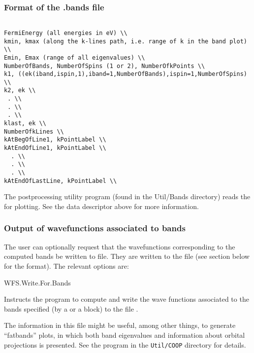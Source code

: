 \subsubsection{Format of the .bands file}

\begin{verbatim}

FermiEnergy (all energies in eV) \\
kmin, kmax (along the k-lines path, i.e. range of k in the band plot) \\
Emin, Emax (range of all eigenvalues) \\
NumberOfBands, NumberOfSpins (1 or 2), NumberOfkPoints \\
k1, ((ek(iband,ispin,1),iband=1,NumberOfBands),ispin=1,NumberOfSpins) \\
k2, ek \\
 . \\
 . \\
 . \\
klast, ek \\
NumberOfkLines \\
kAtBegOfLine1, kPointLabel \\
kAtEndOfLine1, kPointLabel \\
  . \\
  . \\
  . \\
kAtEndOfLastLine, kPointLabel \\
\end{verbatim}

\noindent
The  postprocessing
utility program (found in the Util/Bands directory) reads the
 for plotting.  See the  data
descriptor above for more information.


\subsubsection{Output of wavefunctions associated to bands}
\label{sec:wf-bands}

The user can optionally request that the wavefunctions corresponding
to the computed bands be written to file.  They are written to the
 file (see section below for the format). The
relevant options are:

\begin{fdflogicalF}{WFS.Write.For.Bands}
  
  Instructs the program to compute and write the wave functions
  associated to the bands specified (by a  or a
   block) to the file .

  The information in this file might be useful, among other things, to
  generate ``fatbands'' plots, in which both band eigenvalues and
  information about orbital projections is presented.
   See the  program in the
  \texttt{Util/COOP} directory for details.

\end{fdflogicalF}

